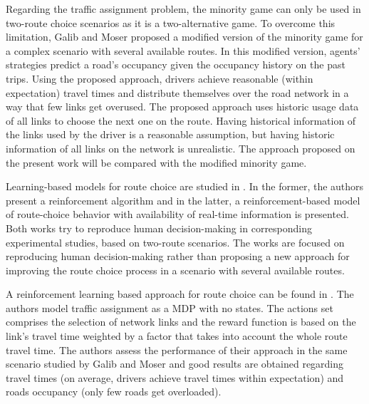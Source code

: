\documentclass{RITA}
\begin{document}
Regarding the traffic assignment problem, the minority game can only be used in two-route choice scenarios as it is a two-alternative game. To overcome this limitation, Galib and Moser \cite{Galib&Moser2011} proposed a modified version of the minority game for a complex scenario with several available routes. In this modified version, agents' strategies predict a road's occupancy given the occupancy history on the past trips. Using the proposed approach, drivers achieve reasonable (within expectation) travel times and distribute themselves over the road network in a way that few links get overused. The proposed approach uses historic usage data of all links to choose the next one on the route. Having historical information of the links used by the driver is a reasonable assumption, but having historic information of all links on the network is unrealistic. The approach proposed on the present work will be compared with the modified minority game. 


Learning-based models for route choice are studied in \cite{Chmura&Pitz2007,Ben-Elia&Shiftan2010}. In the former, the authors present a reinforcement algorithm and in the latter, a reinforcement-based model of route-choice behavior with availability of real-time information is presented. Both works try to reproduce human decision-making in corresponding experimental studies, based on two-route scenarios. The works are focused on reproducing human decision-making rather than proposing a new approach for improving the route choice process in a scenario with several available routes.

A reinforcement learning based approach for route choice can be found in \cite{Tavares&Bazzan2012}. The authors model traffic assignment as a MDP with no states. The actions set comprises the selection of network links and the reward function is based on the link's travel time weighted by a factor that takes into account the whole route travel time. The authors assess the performance of their approach in the same scenario studied by Galib and Moser \cite{Galib&Moser2011} and good results are obtained regarding travel times (on average, drivers achieve travel times within expectation) and roads occupancy (only few roads get overloaded). 
\end{document}
